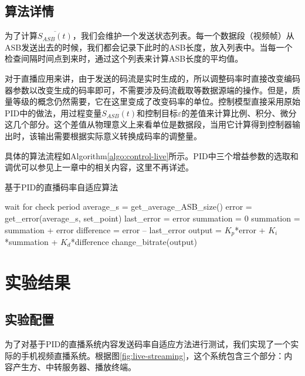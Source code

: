 \subsection{算法详情}

为了计算$\overline{S_{ASB}(t)}$，我们会维护一个发送状态列表。每一个数据段（视频帧）从ASB发送出去的时候，我们都会记录下此时的ASB长度，放入列表中。当每一个检查间隔时间点到来时，通过这个列表来计算ASB长度的平均值。

对于直播应用来讲，由于发送的码流是实时生成的，所以调整码率时直接改变编码器参数以改变生成的码率即可，不需要涉及码流截取等数据源端的操作。但是，质量等级的概念仍然需要，它在这里变成了改变码率的单位。控制模型直接采用原始PID中的做法，用过程变量$\overline{S_{ASB}(t)}$和控制目标$\varepsilon$的差值来计算比例、积分、微分这几个部分。这个差值从物理意义上来看单位是数据段，当用它计算得到控制器输出时，该输出需要根据实际意义转换成码率的调整量。

具体的算法流程如Algorithm\ref{algo:control-live}所示。PID中三个增益参数的选取和调优可以参见上一章中的相关内容，这里不再详述。

\vspace{10pt}
\begin{algorithm}
	\vspace{10pt}
	\caption{基于PID的直播码率自适应算法}
	\label{algo:control-live}
	\begin{algorithmic}
		\STATE wait for check period
		\STATE average\_s = get\_average\_ASB\_size()
		\STATE error = get\_error(average\_s, set\_point)
			\STATE last\_error = error
			\STATE summation = 0
		\ELSE
			\STATE summation = summation + error
			\STATE difference = error – last\_error
			\STATE output = $K_p$*error + $K_i$*summation + $K_d$*difference
			\STATE change\_bitrate(output)
		\ENDIF
		\ENDWHILE
	\end{algorithmic}
	\vspace{10pt}
\end{algorithm}
\vspace{10pt}
	
\section{实验结果}

\subsection{实验配置}

为了对基于PID的直播系统内容发送码率自适应方法进行测试，我们实现了一个实际的手机视频直播系统。根据图\ref{fig:live-streaming}，这个系统包含三个部分：内容产生方、中转服务器、播放终端。

